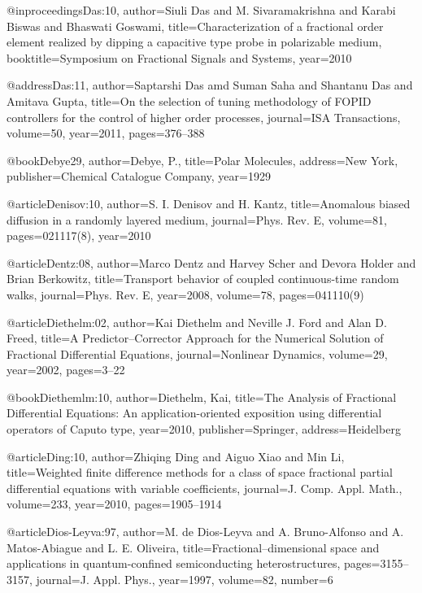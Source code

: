 \begin{thebibliography}{99}
@inproceedings{Das:10,
  author={Siuli Das and M. Sivaramakrishna and Karabi Biswas and Bhaswati Goswami},
  title={Characterization of a fractional order element realized by dipping a capacitive
    type probe in polarizable medium},
  booktitle={Symposium on Fractional Signals and Systems},
  year={2010}
}

@address{Das:11,
  author={Saptarshi Das amd Suman Saha and Shantanu Das and Amitava Gupta},
  title={On the selection of tuning methodology of {FOPID} controllers for the
    control of higher order processes},
  journal={ISA Transactions},
  volume={50},
  year={2011},
  pages={376--388}
}

@book{Debye29,
  author={Debye, P.},
  title={Polar Molecules},
  address={New York},
  publisher={Chemical Catalogue Company},
  year={1929}
}

@article{Denisov:10,
  author={S. I. Denisov and H. Kantz},
  title={Anomalous biased diffusion in a randomly layered medium},
  journal={Phys. Rev. E},
  volume={81},
  pages={021117(8)},
  year={2010}
}

@article{Dentz:08,
  author={Marco Dentz and Harvey Scher and Devora Holder and Brian Berkowitz},
  title={Transport behavior of coupled continuous-time random walks},
  journal={Phys. Rev. E},
  year={2008},
  volume={78},
  pages={041110(9)}
}

@article{Diethelm:02,
  author={Kai Diethelm and Neville J. Ford and Alan D. Freed},
  title={A {P}redictor--{C}orrector Approach for the Numerical Solution of Fractional
    Differential Equations},
  journal={Nonlinear Dynamics},
  volume={29},
  year={2002},
  pages={3--22}
}

@book{Diethemlm:10,
  author={Diethelm, Kai},
  title={The Analysis of Fractional Differential Equations: An application-oriented
    exposition using differential operators of {C}aputo type},
  year={2010},
  publisher={Springer},
  address={Heidelberg}
}

@article{Ding:10,
  author={Zhiqing Ding and Aiguo Xiao and Min Li},
  title={Weighted finite difference methods for a class of space fractional partial
    differential equations with variable coefficients},
  journal={J. Comp. Appl. Math.},
  volume={233},
  year={2010},
  pages={1905--1914}
}

@article{Dios-Leyva:97,
  author={M. de Dios-Leyva and A. Bruno-Alfonso and A. Matos-Abiague and L. E.
    Oliveira},
  title={Fractional--dimensional space and applications in quantum-confined semiconducting
    heterostructures},
  pages={3155--3157},
  journal={J. Appl. Phys.},
  year={1997},
  volume={82},
  number={6}
}


\end{thebibliography}
